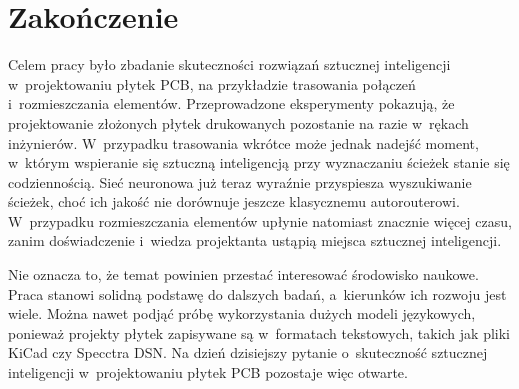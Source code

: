 
\chapter{Zakończenie}

Celem pracy było zbadanie skuteczności rozwiązań sztucznej inteligencji
w~projektowaniu płytek PCB, na przykładzie trasowania połączeń
i~rozmieszczania elementów. Przeprowadzone eksperymenty pokazują, że
projektowanie złożonych płytek drukowanych pozostanie na razie w~rękach
inżynierów. W~przypadku trasowania wkrótce może jednak nadejść moment,
w~którym wspieranie się sztuczną inteligencją przy wyznaczaniu ścieżek
stanie się codziennością. Sieć neuronowa już teraz wyraźnie przyspiesza
wyszukiwanie ścieżek, choć ich jakość nie dorównuje jeszcze klasycznemu
autorouterowi. W~przypadku rozmieszczania elementów upłynie natomiast
znacznie więcej czasu, zanim doświadczenie i~wiedza projektanta ustąpią
miejsca sztucznej inteligencji.

Nie oznacza to, że temat powinien przestać interesować środowisko
naukowe. Praca stanowi solidną podstawę do dalszych badań, a~kierunków
ich rozwoju jest wiele. Można nawet podjąć próbę wykorzystania dużych
modeli językowych, ponieważ projekty płytek zapisywane są w~formatach
tekstowych, takich jak pliki KiCad czy Specctra DSN. Na dzień dzisiejszy
pytanie o~skuteczność sztucznej inteligencji w~projektowaniu płytek PCB
pozostaje więc otwarte.
